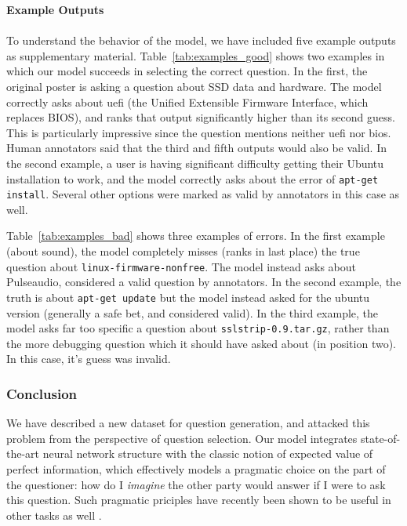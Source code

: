 \documentclass[11pt]{article}
\begin{document}
\textbf{Example Outputs}\\\\

To understand the behavior of the model, we have included five example outputs as supplementary material.
Table~\ref{tab:examples_good} shows two examples in which our model succeeds in selecting the correct question.
In the first, the original poster is asking a question about SSD data and hardware.
The model correctly asks about uefi (the Unified Extensible Firmware Interface, which replaces BIOS), and ranks that output significantly higher than its second guess.
This is particularly impressive since the question mentions neither uefi nor bios. Human annotators said that the third and fifth outputs would also be valid. In the second example, a user is having significant difficulty getting their Ubuntu installation to work, and the model correctly asks about the error of \texttt{\small apt-get install}.
Several other options were marked as valid by annotators in this case as well.

Table~\ref{tab:examples_bad} shows three examples of errors.
In the first example (about sound), the model
completely misses (ranks in last place) the true question about \texttt{\small linux-firmware-nonfree}.
The model instead asks about Pulseaudio, considered a valid question by annotators.
In the second example, the truth is about \texttt{\small apt-get update} but the model instead asked for the ubuntu version (generally a safe bet, and considered valid). %
In the third example, the model asks far too specific a question about \texttt{\small sslstrip-0.9.tar.gz}, rather than the more debugging question which it should have asked about (in position two).
In this case, it's guess was invalid.


\subsubsection{Conclusion}

We have described a new dataset for question generation, and attacked this problem from the perspective of question selection.
Our model integrates state-of-the-art neural network structure with the classic notion of expected value of perfect information, which effectively models a pragmatic choice on the part of the questioner: how do I \emph{imagine} the other party would answer if I were to ask this question. Such pragmatic priciples have recently been shown to be useful in other tasks as well \cite{golland2010game,smith2013learning,orita2015discourse,andreas2016reasoning}.
\end{document}
